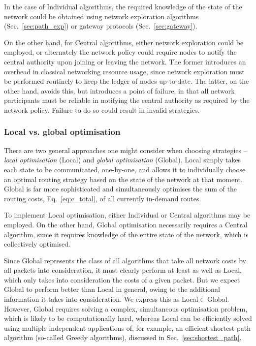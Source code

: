 \documentclass[aps,rmp,twocolumn,amsmath,amssymb,nofootinbib,superscriptaddress,longbibliography,floatfix]{revtex4-1}
\begin{document}
In the case of {\sc Individual} algorithms, the required knowledge of the state of the network could be obtained using network exploration algorithms (Sec.~\ref{sec:path_exp}) or gateway protocols (Sec.~\ref{sec:gateway}). 

On the other hand, for {\sc Central} algorithms, either network exploration could be employed, or alternately the network policy could require nodes to notify the central authority upon joining or leaving the network. The former introduces an overhead in classical networking resource usage, since network exploration must be performed routinely to keep the ledger of nodes up-to-date. The latter, on the other hand, avoids this, but introduces a point of failure, in that all network participants must be reliable in notifying the central authority as required by the network policy. Failure to do so could result in invalid strategies.

%
%

\subsubsection{Local vs. global optimisation}

There are two general approaches one might consider when choosing strategies -- \emph{local optimisation} ({\sc Local}) and \emph{global optimisation} ({\sc Global}). {\sc Local} simply takes each state to be communicated, one-by-one, and allows it to individually choose an optimal routing strategy based on the state of the network at that moment. {\sc Global} is far more sophisticated and simultaneously optimises the sum of the routing costs, Eq.~\ref{eq:c_total}, of all currently in-demand routes.

To implement {\sc Local} optimisation, either {\sc Individual} or {\sc Central} algorithms may be employed. On the other hand, {\sc Global} optimisation necessarily requires a {\sc Central} algorithm, since it requires knowledge of the entire state of the network, which is collectively optimised.

Since {\sc Global} represents the class of all algorithms that take all network costs by all packets into consideration, it must clearly perform at least as well as {\sc Local}, which only takes into consideration the costs of a given packet. But we expect {\sc Global} to perform better than {\sc Local} in general, owing to the additional information it takes into consideration. We express this as \mbox{{\sc Local}$\subset${\sc Global}}. However, {\sc Global} requires solving a complex, simultaneous optimisation problem, which is likely to be computationally hard, whereas {\sc Local} can be efficiently solved using multiple independent applications of, for example, an efficient shortest-path algorithm (so-called {\sc Greedy} algorithms), discussed in Sec.~\ref{sec:shortest_path}.
\end{document}
